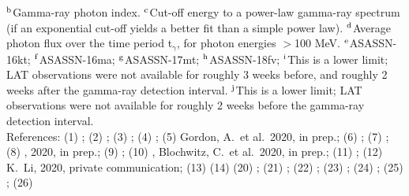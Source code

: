 \begin{table}[h]
\begin{tabnote}
$^{\rm b}$Gamma-ray photon index.
$^{\rm c}$Cut-off energy to a power-law gamma-ray spectrum (if an exponential cut-off yields a better fit than a simple power law).
$^{\rm d}$Average photon flux over the time period t$_{\gamma}$, for photon energies $>$100 MeV.
$^{\rm e}$ASASSN-16kt; $^{\rm f}$ASASSN-16ma; $^{\rm g}$ASASSN-17mt; $^{\rm h}$ASASSN-18fv;  
$^{\rm i}$This is a lower limit; LAT observations were not available for roughly 3 weeks before, and roughly 2 weeks after the gamma-ray detection interval. 
$^{\rm j}$This is a lower limit; LAT observations were not available for roughly 2 weeks before the gamma-ray detection interval. 
\\
References: %
(1) \citealt{Abdo+10};
(2) \citealt{Ackermann+14}; 
(3) \citealt{Cheung+16};
(4) \citealt{Cheung+16_16kt}; 
(5) Gordon, A.\ et al.\ 2020, in prep.; 
(6) \citealt{Nelson+19}; 
(7) \citealt{Li+17}; 
(8)  \citealt{Li+17_17mt}, 2020, in prep.; 
(9) \citealt{Aydi+20}; 
(10) \citealt{Li+18}, Blochwitz, C.\ et al.\ 2020, in prep.; 
(11) \citet{Li+19};
(12) K.\ Li, 2020, private communication;
(13) \citet{Li+20}
(14) \citet{Franckowiak+18}
(20) \citealt{Ozdonmez+16}; 
(21) \citealt{Finzell+15};  
(22) \citet{Linford+15};
(23) \citealt{Schaefer+14}; 
(24) \citealt{Mason+18}; 
(25) \citet{Schaefer18};
(26) \citet{Bailer-Jones+18}
\end{tabnote}
\end{table}

